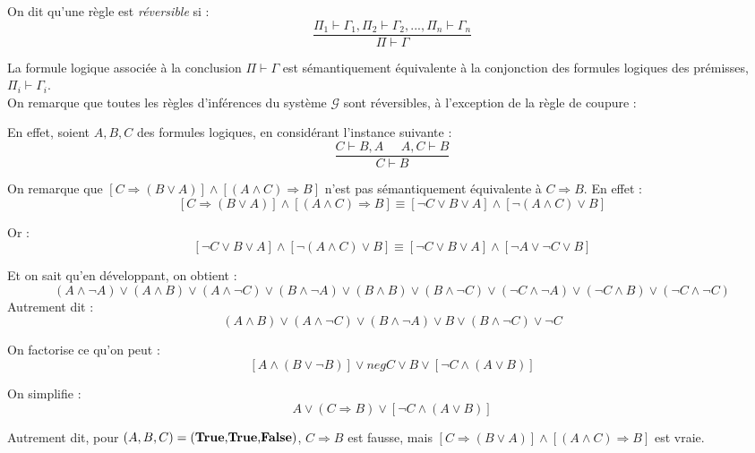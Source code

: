 \documentclass{article}
\begin{document}
On dit qu'une règle est \textit{réversible} si :
$$\frac{\Pi_1 \vdash \Gamma_1 , \Pi_2 \vdash \Gamma_2 ,..., \Pi_n \vdash \Gamma_n}{\Pi \vdash \Gamma}$$

La formule logique associée à la conclusion $\Pi \vdash \Gamma$ est sémantiquement équivalente à la conjonction des formules logiques des prémisses, $\Pi_i \vdash \Gamma_i$.
\\

On remarque que toutes les règles d'inférences du système $\mathcal{G}$ sont réversibles, à l'exception de la règle de coupure :

En effet, soient $A,B,C$ des formules logiques, en considérant l'instance suivante :
$$\frac{C \vdash B,A \;\;\;\;\; A,C \vdash B}{C \vdash B}$$

On remarque que $[C \Rightarrow (B \lor A)] \wedge [(A \wedge C) \Rightarrow B]$ n'est pas sémantiquement équivalente à $C \Rightarrow B$. En effet :
$$[C \Rightarrow (B \lor A)] \wedge [(A \wedge C) \Rightarrow B] \equiv [\neg C \lor B \lor A] \wedge [\neg (A \wedge C) \lor B]$$

Or :
$$[\neg C \lor B \lor A] \wedge [\neg (A \wedge C) \lor B] \equiv [\neg C \lor B \lor A] \wedge [\neg A \lor \neg C \lor B]$$

Et on sait qu'en développant, on obtient :
$$(A \wedge \neg A) \lor (A \wedge B) \lor (A \wedge \neg C) \lor (B \wedge \neg A) \lor (B \wedge B) \lor (B \wedge \neg C) \lor (\neg C \wedge \neg A) \lor (\neg C \wedge B) \lor (\neg C \wedge \neg C)$$
Autrement dit :
$$(A \wedge B)\lor(A \wedge \neg C)\lor(B \wedge \neg A) \lor B \lor (B \wedge \neg C) \lor \neg C$$

On factorise ce qu'on peut :
$$[A \wedge (B \lor \neg B)] \lor neg C \lor B \lor [\neg C \wedge (A \lor B)]$$

On simplifie :
$$A \lor (C \Rightarrow B) \lor [\neg C \wedge (A \lor B)]$$

Autrement dit, pour $(A,B,C) = \textup{(\textbf{True},\textbf{True},\textbf{False})}$, $C \Rightarrow B$ est fausse, mais $[C \Rightarrow (B \lor A)] \wedge [(A \wedge C) \Rightarrow B]$ est vraie.
\end{document}
